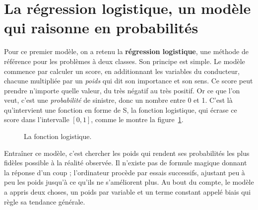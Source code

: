 \documentclass[12pt,oneside,noprintercorrection]{iut}
\begin{document}
\section{La régression logistique, un modèle qui raisonne en probabilités}

Pour ce premier modèle, on a retenu la \textbf{régression logistique}, une méthode
de référence pour les problèmes à deux classes. Son principe est simple. Le modèle
commence par calculer un score, en additionnant les variables du conducteur, chacune
multipliée par un \emph{poids} qui dit son importance et son sens. Ce score peut prendre
n'importe quelle valeur, du très négatif au très positif. Or ce que l'on veut, c'est une
\emph{probabilité} de sinistre, donc un nombre entre 0 et 1. C'est là qu'intervient une
fonction en forme de S, la fonction logistique, qui écrase ce score dans l'intervalle
$[0,1]$, comme le montre la figure~\ref{fig:sigmoid}.

\begin{figure}[H]
  \centering
  \caption{La fonction logistique.}
  \label{fig:sigmoid}
\end{figure}

Entraîner ce modèle, c'est chercher les poids qui rendent ses probabilités les plus
fidèles possible à la réalité observée. Il n'existe pas de formule magique donnant la
réponse d'un coup ; l'ordinateur procède par essais successifs, ajustant peu à peu les
poids jusqu'à ce qu'ils ne s'améliorent plus. Au bout du compte, le modèle a appris deux
choses, un poids par variable et un terme constant appelé biais qui règle sa tendance
générale.
\end{document}
